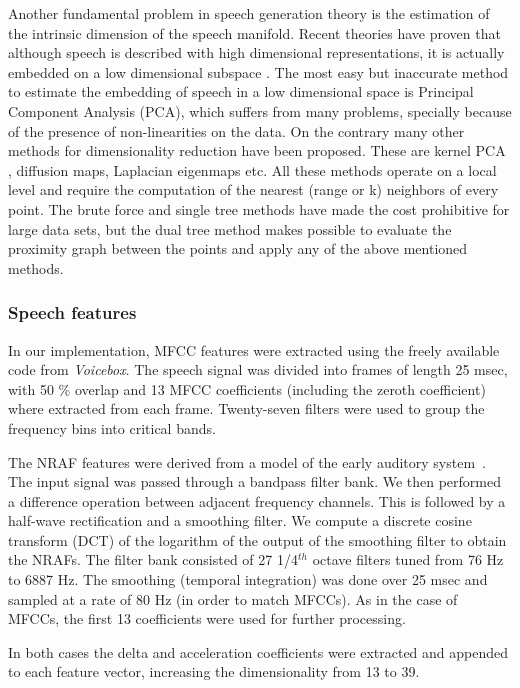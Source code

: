 \documentclass[12pt,letterpaper,doublespaced,ETD,dvips,proposal]{gtthesis}
\begin{document}
\begin{Body}
Another fundamental problem in speech generation theory is the
estimation of the intrinsic dimension of the speech manifold. Recent
theories have proven that although speech is described with high
dimensional representations, it is actually embedded on a low
dimensional subspace \cite{jansen2006ifa}. The most easy but
inaccurate method to estimate the embedding of speech in a low
dimensional space is Principal Component Analysis (PCA), which
suffers from many problems, specially because of the presence of
non-linearities on the data. On the contrary many other methods for
dimensionality reduction have been proposed. These are kernel PCA
\cite{scholkopf:nca}, diffusion maps, Laplacian eigenmaps
\cite{coifman2006dm} etc. All these methods operate on a local level
and require the computation of the nearest (range or k) neighbors of
every point. The brute force and single tree methods have made the
cost prohibitive for large data sets, but the dual tree method makes
possible to evaluate the proximity graph between the points and
apply any of the above mentioned methods.

\subsubsection{Speech features} In our implementation, MFCC features
were extracted using the freely available code from \emph{Voicebox}.
The speech signal was divided into frames of length 25 msec, with 50
\% overlap and 13 MFCC coefficients (including the zeroth
coefficient) where extracted from each frame. Twenty-seven filters
were used to group the frequency bins into critical bands.

The NRAF features were derived from a model of the early auditory
system~\cite{shamma_main}. The input signal was passed through a
bandpass filter bank. We then performed a difference operation
between adjacent frequency channels. This is followed by a half-wave
rectification and a smoothing filter. We compute a discrete cosine
transform (DCT) of the logarithm of the output of the smoothing
filter to obtain the NRAFs. The filter bank consisted of 27
1/4$^{th}$ octave filters tuned from 76 Hz to 6887 Hz. The smoothing
(temporal integration) was done over 25 msec and sampled at a rate
of 80 Hz (in order to match MFCCs). As in the case of MFCCs, the
first 13 coefficients were used for further processing.

In both cases the delta and acceleration coefficients were extracted
and appended to each feature vector, increasing the dimensionality
from 13 to 39.


\end{Body}
\end{document}
